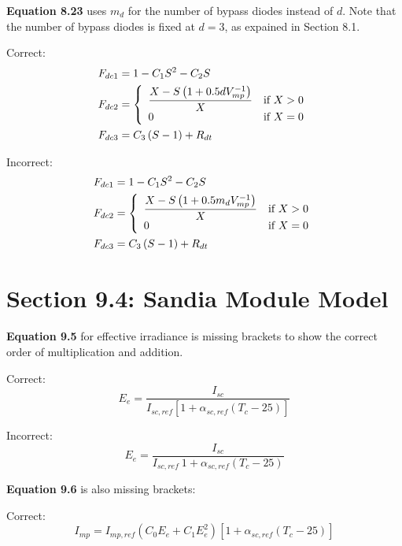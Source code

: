 \documentclass[report]{nrel}
\begin{document}
\textbf{Equation 8.23} uses $m_d$ for the number of bypass diodes instead of $d$. Note that the number of bypass diodes is fixed at $d=3$, as expained in Section 8.1.

Correct:
\begin{align*}
F_{dc1} &= 1-C_1S^2-C_2S \notag\\ %
F_{dc2} &= 
\left\{
   \begin{array}{ll}
      \dfrac{X-S\left(1+0.5 d V^{-1}_{mp}\right)}{X} & \text{if $X>0$}\\
      0 & \text{if $X=0$}\\
   \end{array}
\right. \notag\\ %
F_{dc3} &= C_3\left(S-1\right)+R_{dt} %
\end{align*}

Incorrect:
\begin{align*}
F_{dc1} &= 1-C_1S^2-C_2S \notag\\ %
F_{dc2} &= 
\left\{
   \begin{array}{ll}
      \dfrac{X-S\left(1+0.5 m_d V^{-1}_{mp}\right)}{X} & \text{if $X>0$}\\
      0 & \text{if $X=0$}\\
   \end{array}
\right. \notag\\ %
F_{dc3} &= C_3\left(S-1\right)+R_{dt} %
\end{align*}

\section*{Section 9.4: Sandia Module Model}

\textbf{Equation 9.5} for effective irradiance is missing brackets to show the correct order of multiplication and addition.

Correct:
\begin{equation*}
E_e = \frac{I_{sc}}{I_{sc,ref} \left[1 + \alpha_{sc,ref} (T_c - 25)\right]}
\end{equation*}

Incorrect:
\begin{equation*}
E_e = \frac{I_{sc}}{I_{sc,ref}~1 + \alpha_{sc,ref} (T_c - 25)}
\end{equation*}

\textbf{Equation 9.6} is also missing brackets:

Correct:
\begin{equation*}
I_{mp} = I_{mp,ref} (C_0 E_e + C_1 E_e^2) \left[1 + \alpha_{sc,ref} (T_c - 25)\right]
\end{equation*}
\end{document}
